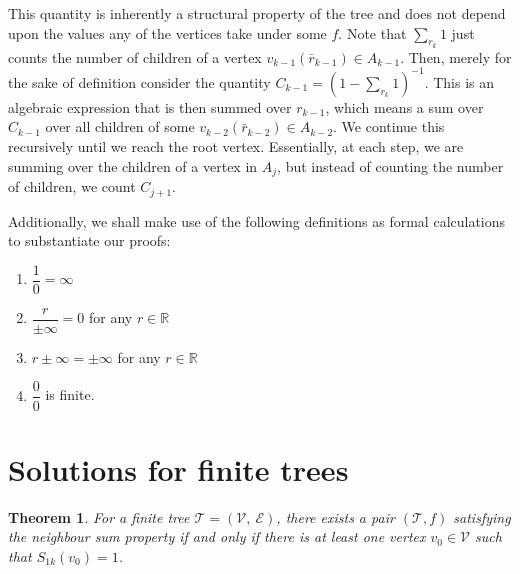 \documentclass[11pt]{article}
\newtheorem{thm}[nummer]{Theorem}
\begin{document}
This quantity is inherently a structural property of the tree and does not depend upon the values any of the vertices take under some $f$. Note that $\sum_{r_k} 1$ just counts the number of children of a vertex $v_{k-1}(\bar{r}_{k-1})\in A_{k-1}$. Then, merely for the sake of definition consider the quantity $C_{k-1}=(1-\sum_{r_k} 1)^{-1}$. This is an algebraic expression that is then summed over $r_{k-1}$, which means a sum over $C_{k-1}$ over all children of some $v_{k-2}(\bar{r}_{k-2})\in A_{k-2}$. We continue this recursively until we reach the root vertex. Essentially, at each step, we are summing over the children of a vertex in $A_j$, but instead of counting the number of children, we count $C_{j+1}$.

Additionally, we shall make use of the following definitions as formal calculations to substantiate our proofs:\begin{enumerate}
    \item $\dfrac{1}{0} = \infty$
    \item $\dfrac{r}{\pm\infty} = 0$ for any $r\in\mathbb{R}$
    \item $r\pm\infty = \pm\infty$ for any $r\in\mathbb{R}$
    \item $\dfrac{0}{0}$ is finite.
\end{enumerate}


\section{Solutions for finite trees}\label{sol}
\begin{thm}\label{main}
    For a finite tree $\mathcal{T}=(\mathcal{V},\:\mathcal{E})$, there exists a pair $(\mathcal{T}, f)$ satisfying the neighbour sum property if and only if there is at least one vertex $v_0\in \mathcal{V}$ such that $S_{1k}(v_0)=1$.
\end{thm}
\end{document}
